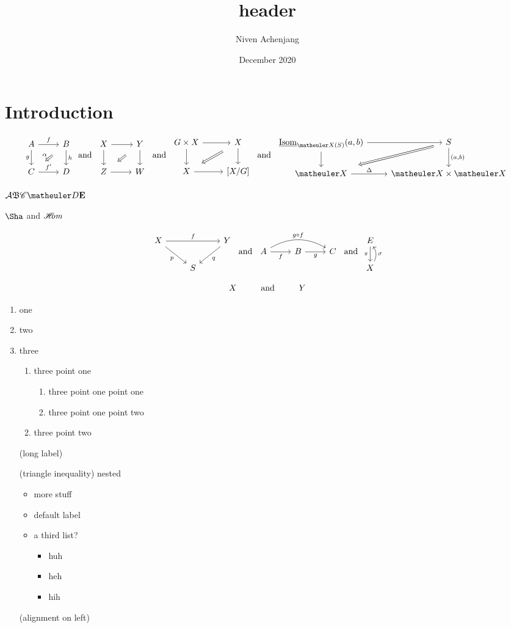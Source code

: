 \documentclass{article}
\title{header}
\author{Niven Achenjang}
\date{December 2020}
\numberwithin{thm}{section}
\numberwithin{prob}{section}
\numberwithin{equation}{section}
\begin{document}
\maketitle

\section{Introduction}

$$\twocommsquare AfBghC{f'}D\alpha\tand\baretwocommsquare XYZW\tand\baretwocommsquare{G\by X}XX{[X/G]}\tand\twocommsquare{\ul\Isom_{\meX(S)}(a,b)}{}S{}{(a,b)}\meX\Delta{\meX\by\meX}{}$$

$\mcA\mf B\msC\meD\mbf E$

$\Sha$ and $\operatorname{\mathscr{H\mkern-7mu}\textit{om}}$

$$\mapover XfYpqS\tand\compdiag AfBgC{g\circ f}\tand\mapwithsect E\pi X\sigma$$

$$X\Text{and}\sspacing Y$$

\begin{enumerate}
    \item one
    \item two
    \item three
    \begin{enumerate}
        \item three point one
        \begin{enumerate}
            \item three point one point one
            \item three point one point two
        \end{enumerate}
        \item three point two
    \end{enumerate}
\end{enumerate}
\begin{itemize}
    \item[(long label)]
    \item[(triangle inequality)] nested
    \begin{itemize}
        \item more stuff
        \item default label
        \item a third list? 
        \begin{itemize}
            \item huh
            \item heh
            \item hih
        \end{itemize}
    \end{itemize}
    \item[(alignment on left)]
\end{itemize}
\end{document}
